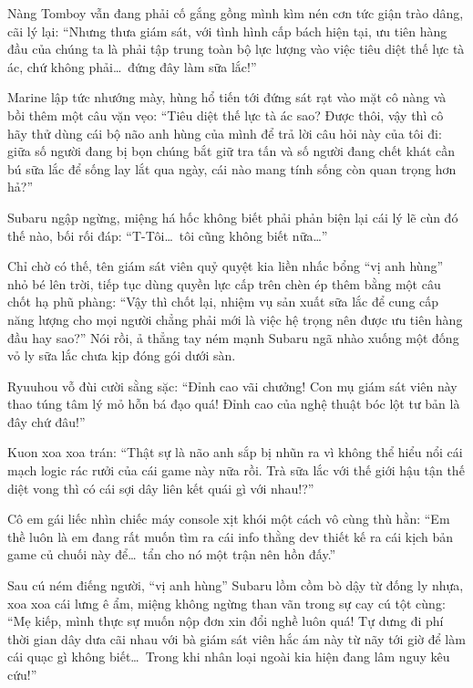 \documentclass[../main.tex]{subfiles}
\begin{document}
\il

Nàng Tomboy vẫn đang phải cố gắng gồng mình kìm nén cơn tức giận trào dâng, cãi lý lại: ``Nhưng thưa giám sát, với tình hình cấp bách hiện tại, ưu tiên hàng đầu của chúng ta là phải tập trung toàn bộ lực lượng vào việc tiêu diệt thế lực tà ác, chứ không phải\dots\ đứng đây làm sữa lắc!''

Marine lập tức nhướng mày, hùng hổ tiến tới đứng sát rạt vào mặt cô nàng và bồi thêm một câu vặn vẹo: ``Tiêu diệt thế lực tà ác sao? Được thôi, vậy thì cô hãy thử dùng cái bộ não anh hùng của mình để trả lời câu hỏi này của tôi đi: giữa số người đang bị bọn chúng bắt giữ tra tấn và số người đang chết khát cần bú sữa lắc để sống lay lắt qua ngày, cái nào mang tính sống còn quan trọng hơn hả?''

Subaru ngập ngừng, miệng há hốc không biết phải phản biện lại cái lý lẽ cùn đó thế nào, bối rối đáp: ``T-Tôi\dots\ tôi cũng không biết nữa\dots''

Chỉ chờ có thế, tên giám sát viên quỷ quyệt kia liền nhấc bổng ``vị anh hùng'' nhỏ bé lên trời, tiếp tục dùng quyền lực cấp trên chèn ép thêm bằng một câu chốt hạ phũ phàng: ``Vậy thì chốt lại, nhiệm vụ sản xuất sữa lắc để cung cấp năng lượng cho mọi người chẳng phải mới là việc hệ trọng nên được ưu tiên hàng đầu hay sao?'' Nói rồi, ả thẳng tay ném mạnh Subaru ngã nhào xuống một đống vỏ ly sữa lắc chưa kịp đóng gói dưới sàn.


\il

Ryuuhou vỗ đùi cười sằng sặc: ``Đỉnh cao vãi chưởng! Con mụ giám sát viên này thao túng tâm lý mỏ hỗn bá đạo quá! Đỉnh cao của nghệ thuật bóc lột tư bản là đây chứ đâu!''

Kuon xoa xoa trán: ``Thật sự là não anh sắp bị nhũn ra vì không thể hiểu nổi cái mạch logic rác rưởi của cái game này nữa rồi. Trà sữa lắc với thế giới hậu tận thế diệt vong thì có cái sợi dây liên kết quái gì với nhau!?''

Cô em gái liếc nhìn chiếc máy console xịt khói một cách vô cùng thù hằn: ``Em thề luôn là em đang rất muốn tìm ra cái info thằng dev thiết kế ra cái kịch bản game củ chuối này để\dots\ tẩn cho nó một trận nên hồn đấy.''

\il

Sau cú ném điếng người, ``vị anh hùng'' Subaru lồm cồm bò dậy từ đống ly nhựa, xoa xoa cái lưng ê ẩm, miệng không ngừng than vãn trong sự cay cú tột cùng: ``Mẹ kiếp, mình thực sự muốn nộp đơn xin đổi nghề luôn quá! Tự dưng đi phí thời gian dây dưa cãi nhau với bà giám sát viên hắc ám này từ nãy tới giờ để làm cái quạc gì không biết\dots\ Trong khi nhân loại ngoài kia hiện đang lâm nguy kêu cứu!''
\end{document}
